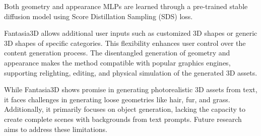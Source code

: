 Both geometry and appearance MLPs are learned through a pre-trained stable diffusion model \citep{rombachStableDiffusion} using Score Distillation Sampling (SDS) loss. 


Fantasia3D allows additional user inputs such as customized 3D shapes or generic 3D shapes of specific categories. This flexibility enhances user control over the content generation process. The disentangled generation of geometry and appearance makes the method compatible with popular graphics engines, supporting relighting, editing, and physical simulation of the generated 3D assets.

While Fantasia3D shows promise in generating photorealistic 3D assets from text, it faces challenges in generating loose geometries like hair, fur, and grass. Additionally, it primarily focuses on object generation, lacking the capacity to create complete scenes with backgrounds from text prompts. Future research aims to address these limitations.
